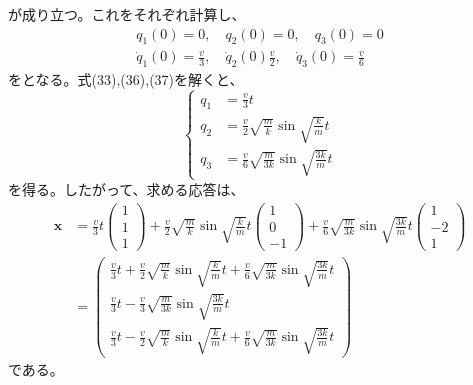 \documentclass[a4paper]{jsarticle}
\begin{document}
が成り立つ。これをそれぞれ計算し、
\begin{align}
  q_1(0) = 0, \quad q_2(0) = 0, \quad q_3(0) = 0 \\
  \dot{q}_1(0) = \frac{v}{3}, \quad \dot{q}_2(0) \frac{v}{2}, \quad \dot{q}_3(0) = \frac{v}{6}
\end{align}
をとなる。式(33),(36),(37)を解くと、
\begin{equation}
  \begin{cases}
    q_1 & = \frac{v}{3} t                                              \\
    q_2 & = \frac{v}{2} \sqrt{\frac{m}{k}} \sin \sqrt{\frac{k}{m}} t   \\
    q_3 & = \frac{v}{6} \sqrt{\frac{m}{3k}} \sin \sqrt{\frac{3k}{m}} t
  \end{cases}
\end{equation}
を得る。したがって、求める応答は、
\begin{equation}
  \begin{aligned}
    \boldsymbol{x} & = \frac{v}{3} t
    \begin{pmatrix}
      1 \\ 1 \\ 1
    \end{pmatrix} +
    \frac{v}{2} \sqrt{\frac{m}{k}} \sin \sqrt{\frac{k}{m}} t
    \begin{pmatrix}
      1 \\ 0 \\ -1
    \end{pmatrix} +
    \frac{v}{6} \sqrt{\frac{m}{3k}} \sin \sqrt{\frac{3k}{m}} t
    \begin{pmatrix}
      1 \\ -2 \\ 1
    \end{pmatrix}                   \\
                   & =
    \begin{pmatrix}
      \frac{v}{3} t +
      \frac{v}{2} \sqrt{\frac{m}{k}} \sin \sqrt{\frac{k}{m}} t +
      \frac{v}{6} \sqrt{\frac{m}{3k}} \sin \sqrt{\frac{3k}{m}} t \\
      \frac{v}{3} t -
      \frac{v}{3} \sqrt{\frac{m}{3k}} \sin \sqrt{\frac{3k}{m}} t \\
      \frac{v}{3} t -
      \frac{v}{2} \sqrt{\frac{m}{k}} \sin \sqrt{\frac{k}{m}} t +
      \frac{v}{6} \sqrt{\frac{m}{3k}} \sin \sqrt{\frac{3k}{m}} t
    \end{pmatrix}
  \end{aligned}
\end{equation}
である。
\end{document}
